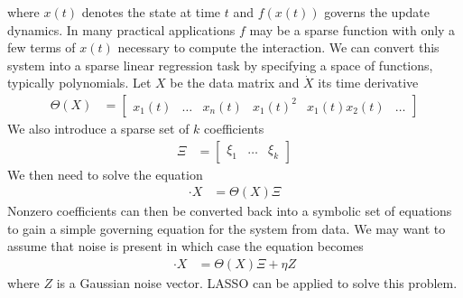 \documentclass[book.tex]{subfiles}
\begin{document}
where $x(t)$ denotes the state at time $t$ and $f(x(t))$ governs the update dynamics. In many practical applications $f$ may be a sparse function with only a few terms of $x(t)$ necessary to compute the interaction. We can convert this system into a sparse linear regression task by specifying a space of functions, typically polynomials. Let $X$ be the data matrix and $\dot{X}$ its time derivative
\begin{align}
    \Theta(X) &= \begin{bmatrix}
        x_1(t)& \dotsc & x_n(t) & x_1(t)^2 & x_1(t) x_2(t) & \dotsc 
    \end{bmatrix}
\end{align}
We also introduce a sparse set of $k$ coefficients
\begin{align}
    \Xi &= \begin{bmatrix}
        \xi_1 & \dotsc & \xi_k
    \end{bmatrix}
\end{align}
We then need to solve the equation
\begin{align}
    \cdot{X} &= \Theta(X) \Xi
\end{align}
Nonzero coefficients can then be converted back into a symbolic set of equations to gain a simple governing equation for the system from data. We may want to assume that noise is present in which case the equation becomes
\begin{align}
\cdot{X} &= \Theta(X) \Xi + \eta Z
\end{align}
where $Z$ is a Gaussian noise vector. LASSO can be applied to solve this problem.

\end{document}
